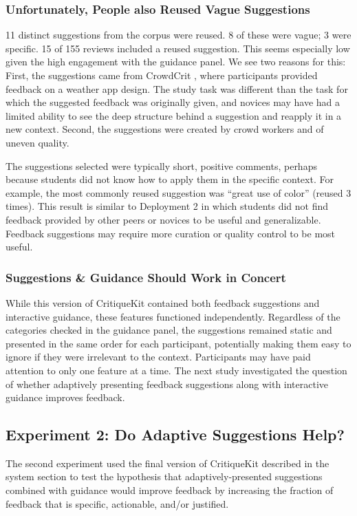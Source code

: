 \subsubsection{Unfortunately, People also Reused Vague Suggestions}
11 distinct suggestions from the corpus were reused. 8 of these were vague; 3 were specific. 15 of 155 reviews included a reused suggestion. This seems especially low given the high engagement with the guidance panel. We see two reasons for this: First, the suggestions came from CrowdCrit \cite{Luther2015}, where participants provided feedback on a weather app design. The study task was different than the task for which the suggested feedback was originally given, and novices may have had a limited ability to see the deep structure behind a suggestion and reapply it in a new context. Second, the suggestions were created by crowd workers and of uneven quality. 

The suggestions selected were typically short, positive comments, perhaps because students did not know how to apply them in the specific context. For example, the most commonly reused suggestion was ``great use of color'' (reused 3 times). This result is similar to Deployment 2 in which students did not find feedback provided by other peers or novices to be useful and generalizable. Feedback suggestions may require more curation or quality control to be most useful. 

\subsubsection{Suggestions \& Guidance Should Work in Concert}
While this version of CritiqueKit contained both feedback suggestions and interactive guidance, these features functioned independently. Regardless of the categories checked in the guidance panel, the suggestions remained static and presented in the same order for each participant, potentially making them easy to ignore if they were irrelevant to the context. Participants may have paid attention to only one feature at a time. The next study investigated the question of whether adaptively presenting feedback suggestions along with interactive guidance improves feedback. 

\subsection{Experiment 2: Do Adaptive Suggestions Help?}
The second experiment used the final version of CritiqueKit described in the system section to test the hypothesis that adaptively-presented suggestions combined with guidance would improve feedback by increasing the fraction of feedback that is specific, actionable, and/or justified.

